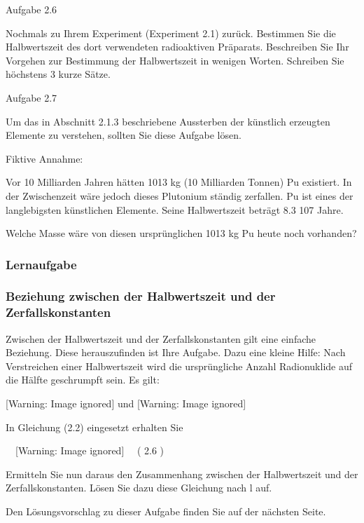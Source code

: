 \documentclass[12pt,a4paper,twoside]{article}
\begin{document}
Aufgabe 2.6

Nochmals zu Ihrem Experiment (Experiment 2.1) zurück. Bestimmen Sie die Halbwertszeit des dort verwendeten radioaktiven Präparats. Beschreiben Sie Ihr Vorgehen zur Bestimmung der Halbwertszeit in wenigen Worten. Schreiben Sie höchstens 3 kurze Sätze.

Aufgabe 2.7

Um das in Abschnitt 2.1.3 beschriebene Aussterben der künstlich erzeugten Elemente zu verstehen, sollten Sie diese Aufgabe lösen.

Fiktive Annahme:

Vor 10 Milliarden Jahren hätten 1013 kg (10 Milliarden Tonnen) Pu existiert. In der Zwischenzeit wäre jedoch dieses Plutonium ständig zerfallen. Pu ist eines der langlebigsten künstlichen Elemente. Seine Halbwertszeit beträgt 8.3 {\textperiodcentered}107 Jahre.

Welche Masse wäre von diesen ursprünglichen 1013 kg Pu heute noch vorhanden?


\bigskip

\subsubsection*{Lernaufgabe}
\subsubsection*{Beziehung zwischen der Halbwertszeit und der Zerfallskonstanten}
Zwischen der Halbwertszeit und der Zerfallskonstanten gilt eine einfache Beziehung. Diese herauszufinden ist Ihre Aufgabe. Dazu eine kleine Hilfe: Nach Verstreichen einer Halbwertszeit wird die ursprüngliche Anzahl Radionuklide auf die Hälfte geschrumpft sein. Es gilt:

  [Warning: Image ignored] %
  und   [Warning: Image ignored] %
 

In Gleichung (2.2) eingesetzt erhalten Sie

\ \   [Warning: Image ignored] %
 \ \ ( 2.6 )

Ermitteln Sie nun daraus den Zusammenhang zwischen der Halbwertszeit und der Zerfallskonstanten. Lösen Sie dazu diese Gleichung nach l auf.

Den Lösungsvorschlag zu dieser Aufgabe finden Sie auf der nächsten Seite.
\end{document}
